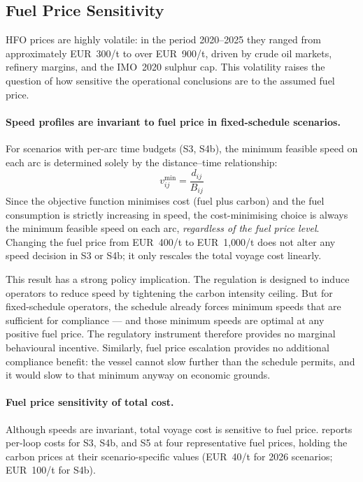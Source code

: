 \subsection{Fuel Price Sensitivity}
\label{sec:disc:fuelprice}

HFO prices are highly volatile: in the period 2020--2025 they ranged from
approximately EUR~300/t to over EUR~900/t, driven by crude oil markets,
refinery margins, and the IMO~2020 sulphur cap.  This volatility raises
the question of how sensitive the operational conclusions are to the assumed
fuel price.

\paragraph{Speed profiles are invariant to fuel price in fixed-schedule scenarios.}
For scenarios with per-arc time budgets (S3, S4b), the minimum feasible
speed on each arc is determined solely by the distance--time relationship:
\begin{equation}
  v_{ij}^{\min} = \frac{d_{ij}}{B_{ij}}
  \label{eq:min_speed}
\end{equation}
Since the objective function minimises cost (fuel plus carbon) and the
fuel consumption is strictly increasing in speed, the cost-minimising
choice is always the minimum feasible speed on each arc, \emph{regardless
of the fuel price level}.  Changing the fuel price from EUR~400/t to
EUR~1{,}000/t does not alter any speed decision in S3 or S4b; it only
rescales the total voyage cost linearly.

This result has a strong policy implication.  The \CII{} regulation is designed
to induce operators to reduce speed by tightening the carbon intensity ceiling.
But for fixed-schedule operators, the schedule already forces minimum speeds
that are sufficient for \CII{} compliance --- and those minimum speeds are
optimal at any positive fuel price.  The regulatory instrument therefore
provides no marginal behavioural incentive.  Similarly, fuel price escalation
provides no additional compliance benefit: the vessel cannot slow further
than the schedule permits, and it would slow to that minimum anyway on
economic grounds.

\paragraph{Fuel price sensitivity of total cost.}
Although speeds are invariant, total voyage cost is sensitive to fuel price.
 reports per-loop costs for S3, S4b, and S5
at four representative fuel prices, holding the \ETS{} carbon prices at
their scenario-specific values (EUR~40/t for 2026 scenarios; EUR~100/t
for S4b).

